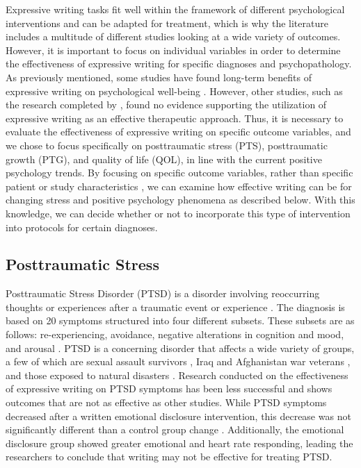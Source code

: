 \documentclass[english,man]{apa6}
\theoremstyle{definition}
\theoremstyle{definition}
\theoremstyle{definition}
\theoremstyle{remark}
\begin{document}
Expressive writing tasks fit well within the framework of different
psychological interventions and can be adapted for treatment, which is
why the literature includes a multitude of different studies looking at
a wide variety of outcomes. However, it is important to focus on
individual variables in order to determine the effectiveness of
expressive writing for specific diagnoses and psychopathology. As
previously mentioned, some studies have found long-term benefits of
expressive writing on psychological well-being \autocite{Park2002}.
However, other studies, such as the research completed by
\textcite{Lancaster2015}, found no evidence supporting the utilization
of expressive writing as an effective therapeutic approach. Thus, it is
necessary to evaluate the effectiveness of expressive writing on
specific outcome variables, and we chose to focus specifically on
posttraumatic stress (PTS), posttraumatic growth (PTG), and quality of
life (QOL), in line with the current positive psychology trends. By
focusing on specific outcome variables, rather than specific patient or
study characteristics \autocite[which are covered extensively
in][]{Frattaroli2006}, we can examine how effective writing can be for
changing stress and positive psychology phenomena as described below.
With this knowledge, we can decide whether or not to incorporate this
type of intervention into protocols for certain diagnoses.

\subsection{Posttraumatic Stress}\label{posttraumatic-stress}

Posttraumatic Stress Disorder (PTSD) is a disorder involving reoccurring
thoughts or experiences after a traumatic event or experience
\autocite{AmericanPsychiatricAssociation2013}. The diagnosis is based on
20 symptoms structured into four different subsets. These subsets are as
follows: re-experiencing, avoidance, negative alterations in cognition
and mood, and arousal \autocite{Crespo2016}. PTSD is a concerning
disorder that affects a wide variety of groups, a few of which are
sexual assault survivors \autocite{Klump2008}, Iraq and Afghanistan war
veterans \autocite{Gentes2014}, and those exposed to natural disasters
\autocite{Wang2000}. Research conducted on the effectiveness of
expressive writing on PTSD symptoms has been less successful and shows
outcomes that are not as effective as other studies. While PTSD symptoms
decreased after a written emotional disclosure intervention, this
decrease was not significantly different than a control group change
\autocite{Sloan2011a}. Additionally, the emotional disclosure group
showed greater emotional and heart rate responding, leading the
researchers to conclude that writing may not be effective for treating
PTSD.
\end{document}
